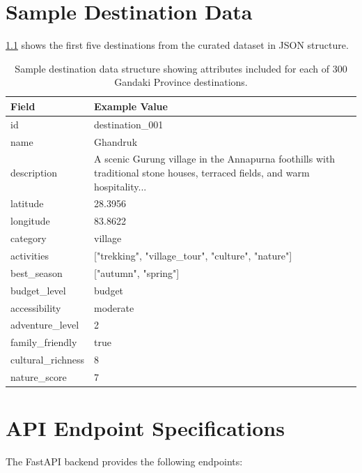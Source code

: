 \documentclass[12pt,a4paper,oneside]{report}
\begin{document}
\appendix

\chapter{Sample Destination Data}
\label{app:destinations}

\cref{tbl:sample_data} shows the first five destinations from the curated dataset in JSON structure.

\begin{table}[h]
\centering
\small
\begin{tabular}{lp{10cm}}
\toprule
\textbf{Field} & \textbf{Example Value} \\
\midrule
id & destination\_001 \\
name & Ghandruk \\
description & A scenic Gurung village in the Annapurna foothills with traditional stone houses, terraced fields, and warm hospitality... \\
latitude & 28.3956 \\
longitude & 83.8622 \\
category & village \\
activities & ["trekking", "village\_tour", "culture", "nature"] \\
best\_season & ["autumn", "spring"] \\
budget\_level & budget \\
accessibility & moderate \\
adventure\_level & 2 \\
family\_friendly & true \\
cultural\_richness & 8 \\
nature\_score & 7 \\
\bottomrule
\end{tabular}
\caption{Sample destination data structure showing attributes included for each of 300 Gandaki Province destinations.}
\label{tbl:sample_data}
\end{table}

\chapter{API Endpoint Specifications}
\label{app:api_spec}

The FastAPI backend provides the following endpoints:
\end{document}
